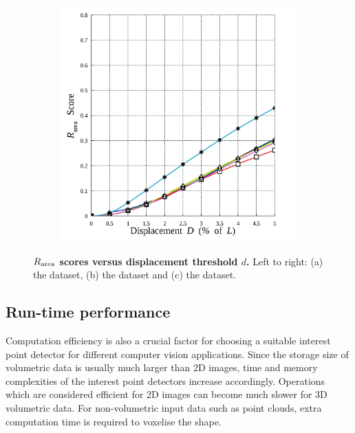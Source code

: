\begin{figure}[ht]
\begin{subfigure}[t]{0.49\linewidth}
		\label{fig/eval/graph_mri}
	\end{subfigure}
	\begin{subfigure}[t]{0.49\linewidth}
		\centering 
		\includegraphics[width=0.95\linewidth]{./fig/eval/graph_stereo.jpg}
		\label{fig/eval/graph_mvs}
	\end{subfigure}
	\caption{\textbf{$R_\textrm{area}$ scores versus displacement threshold $d$.} Left to right: (a) the \meshset dataset, (b) the \mriset dataset and (c) the \stereoset dataset.}
\label{fig/eval/graph2}
\end{figure}

\subsection{Run-time performance}

Computation efficiency is also a crucial factor for choosing a suitable interest point detector for different computer vision applications. Since the storage size of volumetric data is usually much larger than 2D images, time and memory complexities of the interest point detectors increase accordingly. Operations which are considered efficient for 2D images can become much slower for 3D volumetric data. For non-volumetric input data such as point clouds, extra computation time is required to voxelise the shape. 

